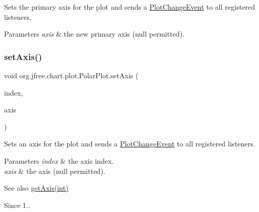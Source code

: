 Sets the primary axis for the plot and sends a \mbox{\hyperlink{}{Plot\+Change\+Event}} to all registered listeners.


\begin{DoxyParams}{Parameters}
{\em axis} & the new primary axis ({\ttfamily null} permitted). \\
\hline
\end{DoxyParams}
\mbox{\label{classorg_1_1jfree_1_1chart_1_1plot_1_1_polar_plot_a225b527fcb7ab354ec7ee747564f9b44}} 
\subsubsection{\texorpdfstring{set\+Axis()}{setAxis()}\hspace{0.1cm}{\footnotesize\ttfamily [2/3]}}
{\footnotesize\ttfamily void org.\+jfree.\+chart.\+plot.\+Polar\+Plot.\+set\+Axis (\begin{DoxyParamCaption}\item[{int}]{index,  }\item[{\mbox{\hyperlink{classorg_1_1jfree_1_1chart_1_1axis_1_1_value_axis}{Value\+Axis}}}]{axis }\end{DoxyParamCaption})}

Sets an axis for the plot and sends a \mbox{\hyperlink{}{Plot\+Change\+Event}} to all registered listeners.


\begin{DoxyParams}{Parameters}
{\em index} & the axis index. \\
\hline
{\em axis} & the axis ({\ttfamily null} permitted).\\
\hline
\end{DoxyParams}
\begin{DoxySeeAlso}{See also}
\mbox{\hyperlink{classorg_1_1jfree_1_1chart_1_1plot_1_1_polar_plot_a354b78f6c68b444dcb767395ac2943f8}{get\+Axis(int)}}
\end{DoxySeeAlso}
\begin{DoxySince}{Since}
1.. 
\end{DoxySince}
\mbox{\label{classorg_1_1jfree_1_1chart_1_1plot_1_1_polar_plot_a5dcb8b82b8c741742f49ad306786d863}} 
